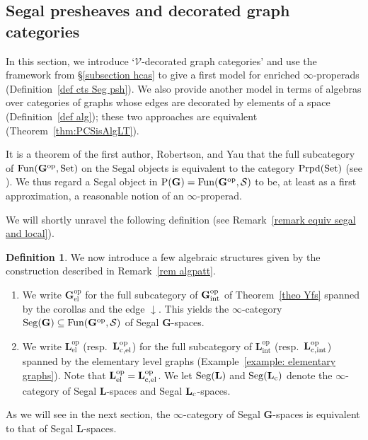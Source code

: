 \documentclass{amsart}
\numberwithin{theorem}{subsection}
\theoremstyle{definition}
\newtheorem{definition}[theorem]{Definition}
\providecommand{\op}{\mathrm{op}}
\providecommand{\xel}{\mathrm{el}}
\providecommand{\xint}{\mathrm{int}}
\newcommand{\xFun}{\operatorname{Fun}}
\newcommand{\xS}{\mathcal{S}}
\newcommand{\xV}{\mathcal{V}}
\newcommand{\Pre}{\name{P}}
\newcommand{\name}[1]{\ensuremath{\text{\textup{#1}}}}
\newcommand{\levelg}{\mathbf{L}}
\newcommand{\levelgconn}{\levelg_{\name{c}}}
\newcommand{\bbY}{\mathbf{G}}
\newcommand{\hryint}{\bbY_{\name{int}}}
\newcommand{\Set}{\name{Set}}
\newcommand{\Seg}{\name{Seg}}
\newcommand{\properads}{\name{Prpd}(\Set)}
\begin{document}
\subsection{Segal presheaves and decorated graph categories}\label{subsec DFV}
In this section, we introduce `$\xV$-decorated graph categories' and use the framework from \S\ref{subsection hcas} to give a first model for enriched $\infty$-properads (Definition~\ref{def cts Seg psh}). 
We also provide another model in terms of algebras over categories of graphs whose edges are decorated by elements of a space (Definition~\ref{def alg}); these two approaches are equivalent (Theorem~\ref{thm:PCSisAlgLT}).

It is a theorem of the first author, Robertson, and Yau that the full subcategory of $\xFun(\bbY^{\op},\Set)$ on the Segal objects is equivalent to the category $\properads$ (see \cite{hrybook}).
We thus regard a Segal object in $\Pre(\bbY) = \xFun(\bbY^{\op},\xS)$ to be, at least as a first approximation, a reasonable notion of an $\infty$-properad.

We will shortly unravel the following definition (see Remark~\ref{remark equiv segal and local}).

\begin{definition}
\label{def segal upsilon and ell}
	We now introduce a few algebraic structures given by the construction described in Remark~\ref{rem algpatt}.
	\begin{enumerate}
		\item 
		We write $\bbY^{\op}_{\xel}$ for the full subcategory of $\hryint^{\op}$ of Theorem~\ref{theo Yfs} spanned by the corollas and the edge $\downarrow$.
		This yields 
		the $\infty$-category $\Seg(\bbY) \subseteq \xFun(\bbY^\op, \xS)$ of Segal $\bbY$-spaces.
		\item We write $\levelg^{\op}_{\xel}$ (resp.\ $\levelg^{\op}_{\name{c},\xel}$) for the full subcategory of $\levelg^{\op}_{\xint}$ (resp.\ $\levelg^{\op}_{\name{c},\xint}$) spanned by the elementary level graphs (Example~\ref{example: elementary graphs}).
		Note that $\levelg^{\op}_{\xel} = \levelg^{\op}_{\name{c},\xel}$.
		We let $\Seg(\levelg)$ and $\Seg(\levelgconn)$ denote the $\infty$-category of Segal $\levelg$-spaces and Segal $\levelgconn$-spaces.
	\end{enumerate}
\end{definition}

As we will see in the next section, the $\infty$-category of Segal $\bbY$-spaces is equivalent to that of Segal $\levelg$-spaces.
\end{document}
